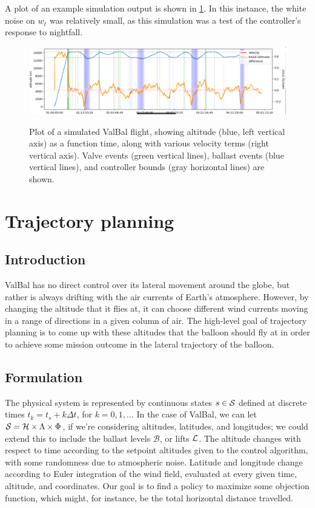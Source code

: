 \documentclass[11pt]{scrartcl} %
\begin{document}
A plot of an example simulation output is shown in \ref{lsim}. In this instance, the white noise on $w_{\dot \ell}$ was relatively small, as this simulation was a test of the controller's response to nightfall.
\begin{figure}[h]
\includegraphics[width=1\linewidth]{lsim.png}
\label{lsim}
\caption{Plot of a simulated ValBal flight, showing altitude (blue, left vertical axis) as a function time, along with various velocity terms (right vertical axis). Valve events (green vertical lines), ballast events (blue vertical lines), and controller bounds (gray horizontal lines) are shown.}
\end{figure}

\newpage
\section{Trajectory planning}
\label{TP}
\subsection{Introduction}

ValBal has no direct control over its lateral movement around the globe, but rather is always drifting with the air currents of Earth's atmosphere. However, by changing the altitude that it flies at, it can choose different wind currents moving in a range of directions in a given column of air. The high-level goal of trajectory planning is to come up with these altitudes that the balloon should fly at in order to achieve some mission outcome in the lateral trajectory of the balloon.



\subsection{Formulation}
The physical system is represented by continuous states $s\in\mathcal{S}$ defined at discrete times $t_k=t_s + k \Delta t$, for $k=0,1,\dots$ In the case of ValBal, we can let $\mathcal{S}=\mathcal{H}\times\Lambda\times\Phi$, if we're considering altitudes, latitudes, and longitudes; we could extend this to include the ballast levels $\mathcal{B}$, or lifts $\mathcal{L}$.
The altitude changes with respect to time according to the setpoint altitudes given to the control algorithm, with some randomness due to atmospheric noise. Latitude and longitude change according to Euler integration of the wind field, evaluated at every given time, altitude, and coordinates. Our goal is to find a policy to maximize some objection function, which might, for instance, be the total horizontal distance travelled.
\end{document}
